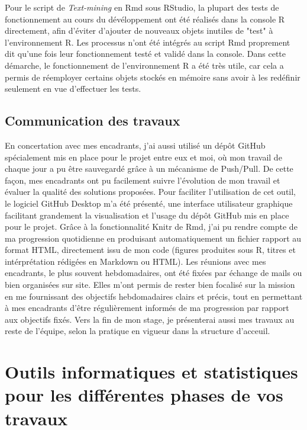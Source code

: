 \documentclass{book}
\begin{document}
    
Pour le script de \textit{Text-mining} en Rmd sous RStudio, la plupart des tests de fonctionnement au cours du dévéloppement ont été réalisés dans la console R directement, afin d'éviter d'ajouter de nouveaux objets inutiles de "test" à l'environnement R. Les processus n'ont été intégrés au script Rmd proprement dit qu'une fois leur fonctionnement testé et validé dans la console. Dans cette démarche, le fonctionnement de l'environnement R a été très utile, car cela a permis de réemployer certains objets stockés en mémoire sans avoir à les redéfinir seulement en vue d'effectuer les tests.
\subsection{Communication des travaux}
\noindent
En concertation avec mes encadrants, j'ai aussi utilisé un dépôt GitHub spécialement
mis en place pour le projet entre eux et moi, où mon travail de chaque jour a pu être sauvegardé grâce à un mécanisme de Push/Pull. De cette façon, mes encadrants ont pu facilement suivre l'évolution de mon travail et évaluer la qualité des solutions proposées. Pour faciliter l'utilisation de cet outil, le logiciel GitHub Desktop m'a été présenté, une interface utilisateur graphique facilitant grandement la visualisation et l'usage du dépôt GitHub mis en place pour le projet. Grâce à la fonctionnalité Knitr de Rmd, j'ai pu rendre compte de ma progression quotidienne en produisant automatiquement un fichier rapport au format HTML, directement issu de mon code (figures produites sous R, titres et intérprétation rédigées en Markdown ou HTML). Les réunions avec mes encadrants, le plus souvent hebdomadaires, ont été fixées par échange de mails ou bien organisées sur site. Elles m'ont permis de rester bien focalisé sur la mission en me fournissant des objectifs hebdomadaires clairs et précis, tout en permettant à mes encadrants d'être régulièrement informés de ma progression par rapport aux objectifs fixés. Vers la fin de mon stage, je présenterai aussi mes travaux au reste de l'équipe, selon la pratique en vigueur dans la structure d'acceuil.

\thispagestyle{fancy}

\section[Outils informatiques et statistiques]{Outils informatiques et
  statistiques pour les différentes phases de vos travaux}
  
\end{document}
